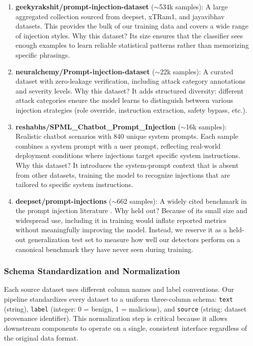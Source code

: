 \documentclass[12pt, letterpaper]{article}   %
\begin{document}
\begin{enumerate}
    \item \textbf{geekyrakshit/prompt-injection-dataset} ($\sim$534k samples): A large aggregated collection sourced from deepset, xTRam1, and jayavibhav datasets. This provides the bulk of our training data and covers a wide range of injection styles. Why this dataset? Its size ensures that the classifier sees enough examples to learn reliable statistical patterns rather than memorizing specific phrasings.

    \item \textbf{neuralchemy/Prompt-injection-dataset} ($\sim$22k samples): A curated dataset with zero-leakage verification, including attack category annotations and severity levels. Why this dataset? It adds structured diversity: different attack categories ensure the model learns to distinguish between various injection strategies (role override, instruction extraction, safety bypass, etc.).

    \item \textbf{reshabhs/SPML\_Chatbot\_Prompt\_Injection} ($\sim$16k samples): Realistic chatbot scenarios with 840 unique system prompts. Each sample combines a system prompt with a user prompt, reflecting real-world deployment conditions where injections target specific system instructions. Why this dataset? It introduces the system-prompt context that is absent from other datasets, training the model to recognize injections that are tailored to specific system instructions.

    \item \textbf{deepset/prompt-injections} ($\sim$662 samples): A widely cited benchmark in the prompt injection literature \cite{ref15}\cite{ref10}\cite{ref33}. Why held out? Because of its small size and widespread use, including it in training would inflate reported metrics without meaningfully improving the model. Instead, we reserve it as a held-out generalization test set to measure how well our detectors perform on a canonical benchmark they have never seen during training.
\end{enumerate}

\subsubsection{Schema Standardization and Normalization}

Each source dataset uses different column names and label conventions. Our pipeline standardizes every dataset to a uniform three-column schema: \texttt{text} (string), \texttt{label} (integer: 0 = benign, 1 = malicious), and \texttt{source} (string: dataset provenance identifier). This normalization step is critical because it allows downstream components to operate on a single, consistent interface regardless of the original data format.
\end{document}
